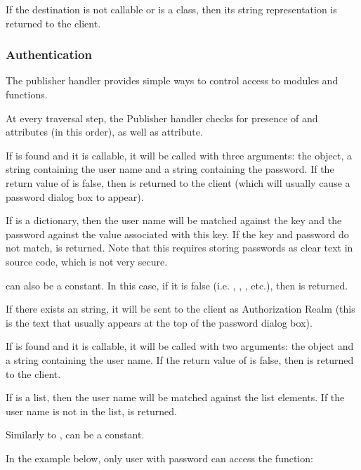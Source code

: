 If the destination is not callable or is a class, then its string
representation is returned to the client.

\subsubsection{Authentication\label{hand-pub-alg-auth}}

The publisher handler provides simple ways to control access to
modules and functions.

At every traversal step, the Publisher handler checks for presence of
 and  attributes (in this order), as 
well as  attribute. 

If  is found and it is callable, it will be called
with three arguments: the  object, a string containing
the user name and a string containing the password. If the return
value of
 is false, then  is
returned to the client (which will usually cause a password dialog box
to appear).

If  is a dictionary, then the user name will be
matched against the key and the password against the value associated
with this key. If the key and password do not match, 
 is returned. Note that this requires
storing passwords as clear text in source code, which is not very secure.

 can also be a constant. In this case, if it is false
(i.e. , , , etc.), then 
 is returned.

If there exists an  string, it will be sent
to the client as Authorization Realm (this is the text that usually
appears at the top of the password dialog box).

If  is found and it is callable, it will be called
with two arguments: the  object and a string containing
the user name. If the return value of  is false, then
 is returned to the client.

If  is a list, then the user name will be matched
against the list elements. If the user name is not in the list, 
 is returned.

Similarly to ,  can be a constant.

In the example below, only user  with password 
can access the  function:

